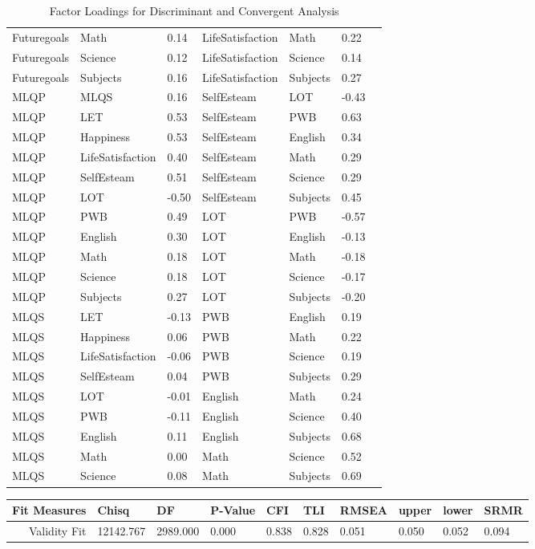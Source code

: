 \documentclass{article}\usepackage[]{graphicx}\usepackage[]{color}
\begin{document}
\begin{table}[!]
\begin{tabular}{lllllll}
Futuregoals & Math & 0.14 & LifeSatisfaction & Math & 0.22 \\ 
Futuregoals & Science & 0.12 & LifeSatisfaction & Science & 0.14 \\ 
Futuregoals & Subjects & 0.16 & LifeSatisfaction & Subjects & 0.27 \\ 
MLQP & MLQS & 0.16 & SelfEsteam & LOT & -0.43 \\ 
MLQP & LET & 0.53 & SelfEsteam & PWB & 0.63 \\ 
MLQP & Happiness & 0.53 & SelfEsteam & English & 0.34 \\ 
MLQP & LifeSatisfaction & 0.40 & SelfEsteam & Math & 0.29 \\ 
MLQP & SelfEsteam & 0.51 & SelfEsteam & Science & 0.29 \\ 
MLQP & LOT & -0.50 & SelfEsteam & Subjects & 0.45 \\ 
MLQP & PWB & 0.49 & LOT & PWB & -0.57 \\ 
MLQP & English & 0.30 & LOT & English & -0.13 \\ 
MLQP & Math & 0.18 & LOT & Math & -0.18 \\ 
MLQP & Science & 0.18 & LOT & Science & -0.17 \\ 
MLQP & Subjects & 0.27 & LOT & Subjects & -0.20 \\ 
MLQS & LET & -0.13 & PWB & English & 0.19 \\ 
MLQS & Happiness & 0.06 & PWB & Math & 0.22 \\ 
MLQS & LifeSatisfaction & -0.06 & PWB & Science & 0.19 \\ 
MLQS & SelfEsteam & 0.04 & PWB & Subjects & 0.29 \\ 
MLQS & LOT & -0.01 & English & Math & 0.24 \\ 
MLQS & PWB & -0.11 & English & Science & 0.40 \\ 
MLQS & English & 0.11 & English & Subjects & 0.68 \\ 
MLQS & Math & 0.00 & Math & Science & 0.52 \\ 
MLQS & Science & 0.08 & Math & Subjects & 0.69 \\ 
   \hline
\end{tabular}
\caption{Factor Loadings for Discriminant and Convergent Analysis} 
\end{table}
\begin{table}[ht]
\centering
\begin{tabular}{rlllllllll}
  \hline
Fit Measures & Chisq & DF & P-Value & CFI & TLI & RMSEA & upper & lower & SRMR \\   \hline
  Validity Fit & 12142.767 &  2989.000 &     0.000 &     0.838 &     0.828 &     0.051 &     0.050 &     0.052 &     0.094 \\ 
   \hline
\end{tabular}
\end{table}
\end{document}
